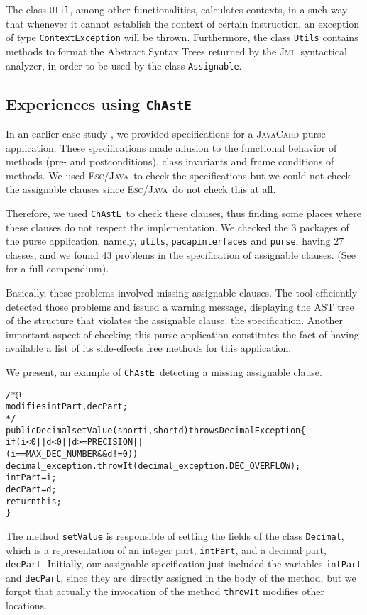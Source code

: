 \documentclass[a4paper]{llncs}
\newcommand{\jml}{\textsc{Jml}}
\newcommand{\escj}{\textsc{Esc/Java}}
\newcommand{\modtool}{\texttt{ChAstE}}
\begin{document}
The class \texttt{Util}, among other functionalities, calculates
contexts, in a such way that whenever it cannot establish the
context of certain instruction, an exception
of type \texttt{ContextException} will be thrown. Furthermore, the
class \texttt{Utils} contains methods to format the
Abstract Syntax Trees returned by the \jml\ syntactical analyzer, in
order to be used by the class \texttt{Assignable}.




\subsection{Experiences using \modtool}
\label{sub-sec-usi-the-too}
In an earlier case study \cite{CatanoH02b}, we provided
specifications for a \textsc{JavaCard} purse application. These
specifications made allusion to the functional behavior of
methods (pre- and postconditions), class invariants and frame
conditions of methods. We used \escj~to check the
specifications but we could not check the assignable clauses
since \escj~do not check this at all. 

Therefore, we used \modtool~to check these clauses, thus finding some
places where these clauses do not respect the implementation. We
checked the 3 packages of the purse application, namely,
\texttt{utils}, \texttt{pacapinterfaces} and \texttt{purse}, having 27
classes, and we found 43 problems in the specification of assignable
clauses. (See~\cite{CatanoH02URL} for a full compendium).

Basically, these problems involved missing assignable clauses. The
tool
efficiently detected those problems and issued a warning
message, displaying the \textsc{AST} tree of the structure that violates
the assignable clause. 
the specification. Another important aspect of checking this purse
application constitutes the fact of having available a list of its
side-effects free methods for this application.

We present, an example of \modtool~detecting a missing assignable
clause. 
\begin{alltt}
/*@ 
  modifies intPart, decPart;
*/ 
public Decimal setValue(short i, short d) throws DecimalException\verb!{!
  if(i < 0 || d < 0 || d >= PRECISION || 
     (i == MAX_DEC_NUMBER && d != 0))
    decimal_exception.throwIt(decimal_exception.DEC_OVERFLOW);
  intPart = i;
  decPart = d;
  return this;
\verb!}!
\end{alltt}
The method \texttt{setValue} is responsible of setting the fields of
the class \texttt{Decimal}, which is a representation of an integer
part, \texttt{intPart}, and a decimal part,
\texttt{decPart}. Initially, our
assignable specification just included the 
variables \texttt{intPart} and \texttt{decPart}, since they are
directly assigned in the body of the method, but we forgot that
actually the invocation of the method \texttt{throwIt} modifies
other locations.
\end{document}

